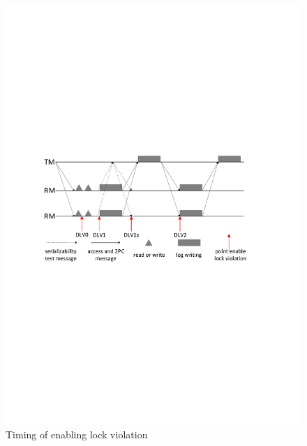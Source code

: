 \documentclass[conference]{IEEEtran}
\begin{document}
\begin{figure}[tbp]
  \centerline{\includegraphics[scale=0.50]{figure/lock_violation_time.pdf}}
  \caption
  {Timing of enabling lock violation}
\label{fig:lock_violation_time}
\end{figure}
\end{document}
